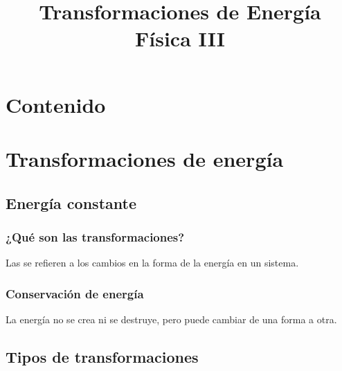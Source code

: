 \documentclass[14pt]{beamer}
\title{\Large{Transformaciones de Energía} \\ \normalsize{Física III}}
\date{}
\begin{document}
\maketitle

\section*{Contenido}

\section{Transformaciones de energía}
\subsection{Energía constante}

\begin{frame}
\frametitle{¿Qué son las transformaciones?}
Las  se refieren a los cambios en la forma de la energía en un sistema.
\end{frame}
\begin{frame}
\frametitle{Conservación de energía}
La energía no se crea ni se destruye, pero puede cambiar de una forma a otra.
\end{frame}

\subsection{Tipos de transformaciones}
\end{document}
